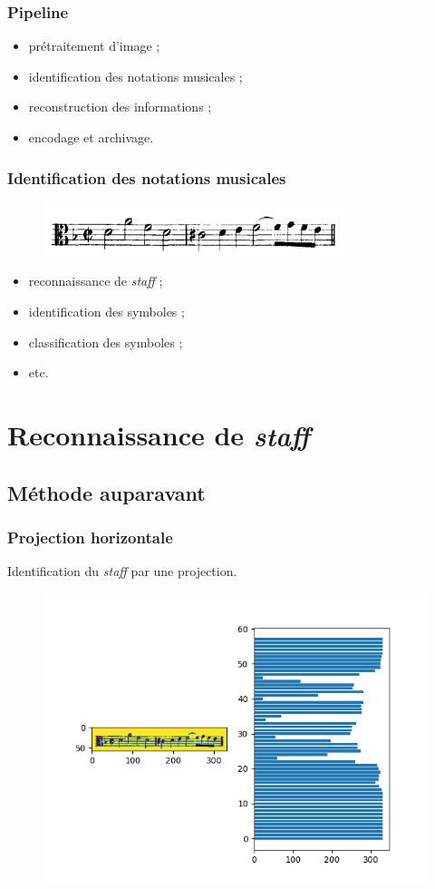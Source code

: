 \documentclass{beamer}
\begin{document}
\begin{frame}
    \frametitle{Pipeline}
    \begin{itemize}
        \item prétraitement d'image ;
        \item identification des notations musicales ;
        \item reconstruction des informations ;
        \item encodage et archivage.
    \end{itemize}
\end{frame}

\begin{frame}
    \frametitle{Identification des notations musicales}
    \begin{figure}
        \centering
        \includegraphics[width=0.7\linewidth]{img/music-notes.png}
    \end{figure}
    \begin{itemize}
        \item reconnaissance de \textit{staff} ;
        \item identification des symboles ;
        \item classification des symboles ;
        \item etc.
    \end{itemize}
\end{frame}

\section{Reconnaissance de \textit{staff}}
\subsection{Méthode auparavant}
\begin{frame}
    \frametitle{Projection horizontale}
    Identification du \textit{staff} par une projection.
    \begin{figure}
        \centering
        \includegraphics[width=0.8\linewidth, height=0.6\textheight]{img/project.png}
    \end{figure}
\end{frame}
\end{document}
